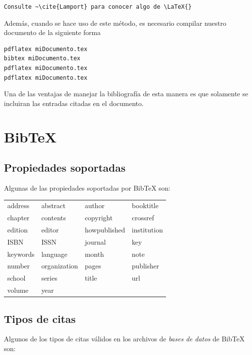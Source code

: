 \documentclass[letterpaper,12pt]{book}
\begin{document}
\begin{verbatim}
Consulte ~\cite{Lamport} para conocer algo de \LaTeX{}
\end{verbatim}

Además, cuando se hace uso de este método, es necesario compilar nuestro
documento de la siguiente forma

\begin{verbatim}
pdflatex miDocumento.tex
bibtex miDocumento.tex
pdflatex miDocumento.tex
pdflatex miDocumento.tex
\end{verbatim}

Una de las ventajas de manejar la bibliografía de esta manera es
que solamente se incluiran las entradas citadas en el documento.

\appendix

\chapter[Apendice A. Bib\TeX{}]{Bib\TeX{}}

\section{Propiedades soportadas}

Algunas de las propiedades soportadas por Bib\TeX{} son:

\begin{tabular}{llll}
address & abstract & author & booktitle \\
chapter & contents & copyright & crossref \\
edition & editor & howpublished & institution \\
ISBN & ISSN & journal & key \\
keywords & language & month & note \\
number & organization & pages & publisher \\
school & series & title &url \\
volume & year & & 
\end{tabular}

\newpage

\section{Tipos de citas}

Algunos de los tipos de citas válidos en los archivos de 
\emph{bases de datos} de Bib\TeX{} son:
\end{document}

